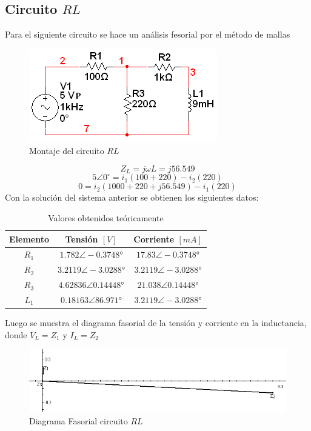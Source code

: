 \documentclass[twocolumn]{IEEEtran}
\begin{document}
\subsection{Circuito $RL$}
\noindent
Para el siguiente circuito se hace un análisis fesorial por el método de mallas
\begin{figure}[H]
	\centering
		\includegraphics[scale=0.75]{circ1.png}
	\caption{Montaje del circuito $RL$}
	\label{fig4}
\end{figure}
\begin{equation}
 {Z_L} = j\omega L = j56.549
\label{ecu24}
\end{equation}
\begin{equation}
 5\angle 0^\circ  = {i_1}(100 + 220) - {i_2}(220)
\label{ecu25}
\end{equation}
\begin{equation}
 0 = {i_2}\left( {1000 + 220 + j56.549} \right) - {i_1}(220)
\label{ecu26}
\end{equation}
\noindent
Con la solución del sistema anterior se obtienen los siguientes datos:
\begin{table}[H]
	\centering
\begin{tabular}[c]{|c|c|c|} \hline
Elemento & Tensión $[V]$ & Corriente $[mA]$ \\ \hline
$R_1$ & $1.782 \angle -0.3748°$ & $17.83 \angle -0.3748°$ \\ \hline
$R_2$ & $3.2119 \angle -3.0288°$ & $3.2119 \angle -3.0288°$ \\ \hline
$R_3$ & $4.62836 \angle 0.14448°$ & $21.038 \angle 0.14448°$ \\ \hline
$L_1$ & $0.18163 \angle 86.971°$ & $3.2119 \angle -3.0288°$ \\ \hline
\end{tabular}
	\caption{Valores obtenidos teóricamente}
	\label{tab3}
\end{table}
\noindent
Luego se muestra el diagrama fasorial de la tensión y corriente en la inductancia, donde $V_L=Z_1$ y $I_L=Z_2$
\begin{figure}[H]
	\centering
		\includegraphics[scale=0.35]{fa1.png}
	\caption{Diagrama Fasorial circuito $RL$}
	\label{fig5}
\end{figure}
\end{document}
